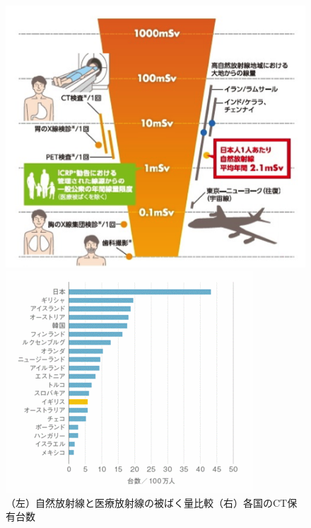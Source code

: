 \begin{figure}[H]
 \begin{minipage}{0.5\hsize}
  \begin{center}
 \includegraphics[bb=0.000000 0.000000 224.141471 195.823812,width=0.9\hsize]{image2/chapter1/dose_medical.png} 
  \end{center}
  \vspace{-1cm}
  \caption*{}
 \end{minipage}
 \begin{minipage}{0.5\hsize}
  \begin{center}
 \includegraphics[bb=0.000000 0.000000 350.000000 313.000000,width=0.9\hsize]{image2/chapter1/CT_number.png} 
  \end{center}
  \vspace{-1cm}
  \caption*{}
 \end{minipage}
 \begin{center}
  \caption{（左）自然放射線と医療放射線の被ばく量比較（右）各国のCT保有台数\cite{dose}}
  \label{fig:dose}
  \end{center}
\end{figure}



